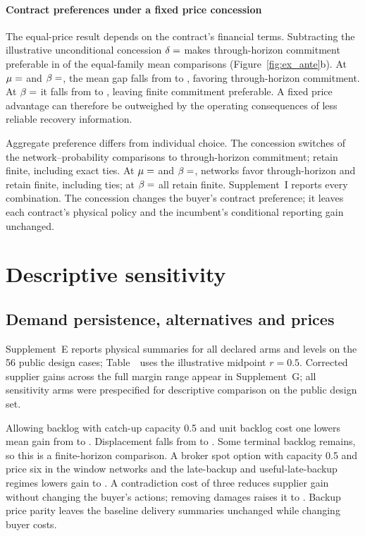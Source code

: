 \documentclass[preprint,11pt,authoryear]{elsarticle}
\begin{document}
\paragraph{Contract preferences under a fixed price concession}
The equal-price result depends on the contract's financial terms. Subtracting the illustrative unconditional concession $\delta=\fd{delta}$ makes through-horizon commitment preferable in  of the  equal-family mean comparisons (Figure~\ref{fig:ex_ante}b). At $\mu=\xa{mu2}$ and $\beta=\xa{beta0}$, the mean gap falls from  to , favoring through-horizon commitment. At $\beta=\xa{beta4}$ it falls from  to , leaving finite commitment preferable. A fixed price advantage can therefore be outweighed by the operating consequences of less reliable recovery information.

Aggregate preference differs from individual choice. The concession switches  of the  network--probability comparisons to through-horizon commitment;  retain finite, including  exact ties. At $\mu=\xa{mu2}$ and $\beta=\xa{beta0}$,  networks favor through-horizon and  retain finite, including  ties; at $\beta=\xa{beta4}$ all retain finite. Supplement~I reports every combination. The concession changes the buyer's contract preference; it leaves each contract's physical policy and the incumbent's conditional reporting gain unchanged.

\section{Descriptive sensitivity}\label{sec:sensitivity}
\subsection{Demand persistence, alternatives and prices}
Supplement~E reports physical summaries for all declared arms and levels on the 56 public design cases; Table~\sensitivitySupplementNumber\ uses the illustrative midpoint $r=0.5$. Corrected supplier gains across the full margin range appear in Supplement~G; all sensitivity arms were prespecified for descriptive comparison on the public design set.

Allowing backlog with catch-up capacity 0.5 and unit backlog cost one lowers mean gain from  to . Displacement falls from  to . Some terminal backlog remains, so this is a finite-horizon comparison. A broker spot option with capacity 0.5 and price six in the window networks and the late-backup and useful-late-backup regimes lowers gain to . A contradiction cost of three reduces supplier gain without changing the buyer's actions; removing damages raises it to . Backup price parity leaves the baseline delivery summaries unchanged while changing buyer costs.
\end{document}
